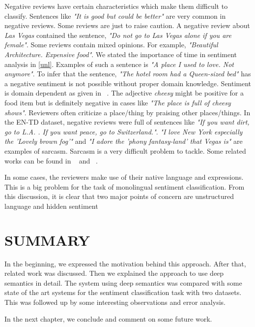 Negative reviews have certain characteristics which make them difficult to classify. Sentences like \textit{"It is good but could be better"} are very common in negative 
reviews. Some reviews are just to raise caution. A negative review about \textit{Las Vegas} contained the sentence, \textit{"Do not go to Las Vegas alone if you are female"}. 
Some reviews contain mixed opinions. For example, \textit{"Beautiful Architecture. Expensive food"}. We stated the importance of time in sentiment analysis in \cref{unl}. 
Examples of such a sentence is \textit{"A place I used to love. Not anymore"}. To infer that the sentence, \textit{"The hotel room had a Queen-sized bed"} has a negative 
sentiment is not possible without proper domain knowledge. Sentiment is domain dependent as given in ~\citep*{liu2010sentiment}. The adjective \textit{cheesy} might be positive for a 
food item but is definitely negative in cases like \textit{"The place is full of cheesy shows"}. Reviewers often criticize a place/thing by praising other places/things. In 
the EN-TD dataset, negative reviews were full of sentences like \textit{"If you want dirt, go to L.A. . If you want peace, go to Switzerland."}. \textit{"I love New York 
especially the 'Lovely brown fog'"} and \textit{"I adore the 'phony fantasy-land' that Vegas is"} are examples of sarcasm. Sarcasm is a very difficult problem to tackle. 
Some related works can be found in ~\citep*{carvalho2009clues} and ~\citep*{gonzalez2011identifying}.

In some cases, the reviewers make use of their native language and expressions. This is a big problem for the task of monolingual sentiment classification. From this 
discussion, it is clear that two major points of concern are unstructured language and hidden sentiment

\section*{SUMMARY}

In the beginning, we expressed the motivation behind this approach. After that, related work was discussed. Then we explained the approach to use deep semantics in detail.
The system using deep semantics was compared with some state of the art systems for the sentiment classification task with two datasets. This was followed up by some
interesting observations and error analysis.

In the next chapter, we conclude and comment on some future work.

\clearpage